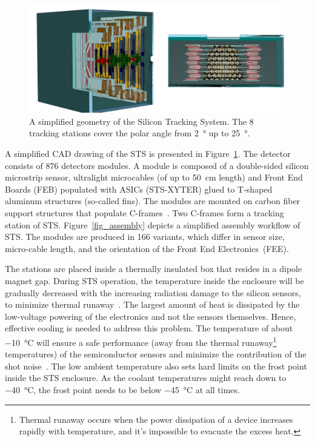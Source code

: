 \begin{figure}[!h]
\centering
\includegraphics[width=0.85\columnwidth]{Chapter2/images/STS.png}
\caption{A simplified geometry of the Silicon Tracking System. The 8 tracking stations cover the polar angle from \SI{2}{\degree} up to \SI{25}{\degree}.}
\label{fig_STS}
\end{figure}
A simplified CAD drawing of the \gls{STS} is presented in Figure~\ref{fig_STS}. The detector consists of 876 detectors modules. A module is composed of a double-sided silicon microstrip sensor, ultralight microcables (of up to 50~cm length) and Front End Boards (\gls{FEB}) populated with ASICs (STS-XYTER) glued to T-shaped aluminum structures (so-called fins). The modules are mounted on carbon fiber support structures that populate C-frames~\cite{progress_report_2016}. Two C-frames form a tracking station of \gls{STS}.  Figure~\ref{fig_assembly} depicts a simplified assembly workflow of \gls{STS}.
The modules are produced in 166 variants, which differ in sensor size, micro-cable length, and the orientation of the Front End Electronics~(\gls{FEE}).  


The stations are placed inside a thermally insulated box that resides in a dipole magnet gap. During \gls{STS} operation, the temperature inside the enclosure will be gradually decreased with the increasing radiation damage to the silicon sensors, to minimize thermal runaway~\cite{Spieler}. The largest amount of heat is dissipated by the low-voltage powering of the electronics and not the sensors themselves. Hence, effective cooling is needed to address this problem.
The temperature of about \SI{-10}{\celsius} will ensure a safe performance (away from the thermal runaway\footnote{Thermal runaway occurs when the power dissipation of a device increases rapidly with temperature, and it's impossible to evacuate the excess heat.} temperatures) of the semiconductor sensors and minimize the contribution of the shot noise~\cite{Spieler}. The low ambient temperature also sets hard limits on the frost point inside the STS enclosure. As the coolant temperatures might reach down to \SI{-40}{\celsius}, the frost point needs to be below \SI{-45}{\celsius} at all times. 

